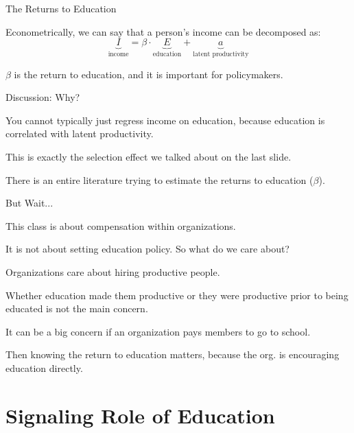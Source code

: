 \documentclass[aspectratio=169,usenames,dvipsnames]{beamer}
\newenvironment{wideitemize}{\itemize\addtolength{\itemsep}{10pt}}{\enditemize}
\begin{document}
\begin{frame}{The Returns to Education}

\begin{wideitemize}
    \item Econometrically, we can say that a person's income can be decomposed as:
\[\underbrace{I}_{\text{income}}  = \beta \cdot \underbrace{E}_{\text{education}} + \underbrace{a}_{\text{latent productivity}}\]
\item $\beta$ is the return to education, and it is important for policymakers.
\item Discussion: Why?
\item You cannot typically just regress income on education, because education is correlated with latent productivity.
\item This is exactly the selection effect we talked about on the last slide.
\item There is an entire literature trying to estimate the returns to education ($\beta$).
\end{wideitemize}
\end{frame}

\begin{frame}{But Wait...}

\begin{wideitemize}
    \item This class is about compensation within organizations.
    \item It is not about setting education policy. So what do we care about?
    \item Organizations care about hiring productive people.
    \item Whether education made them productive or they were productive prior to being educated is not the main concern.
    \item It can be a big concern if an organization pays members to go to school.
    \item Then knowing the return to education matters, because the org. is encouraging education directly.
\end{wideitemize}
\end{frame}


\section{Signaling Role of Education}
\end{document}
